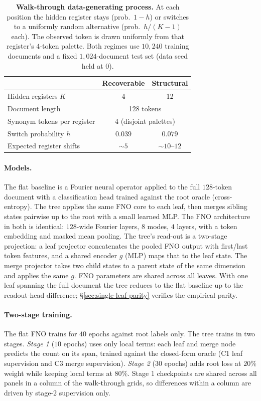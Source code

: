 \begin{table}[htbp]
    \centering
    \small
    \begin{tabular}{lcc}
        \toprule
        & \textbf{Recoverable} & \textbf{Structural} \\
        \midrule
        Hidden registers $K$ & 4 & 12 \\
        Document length & \multicolumn{2}{c}{128 tokens} \\
        Synonym tokens per register & \multicolumn{2}{c}{4 (disjoint palettes)} \\
        \midrule
        Switch probability $h$ & $0.039$ & $0.079$ \\
        Expected register shifts & ${\sim}5$ & ${\sim}10$--$12$ \\
        \bottomrule
    \end{tabular}
    \caption{\textbf{Walk-through data-generating process.}
    At each position the hidden register stays (prob.\ $1{-}h$) or switches to a uniformly random alternative (prob.\ $h/(K{-}1)$ each). The observed token is drawn uniformly from that register's $4$-token palette. Both regimes use $10{,}240$ training documents and a fixed $1{,}024$-document test set (data seed held at $0$).}
    \label{tab:dgp-full}
\end{table}

\paragraph{Models.}
The flat baseline is a Fourier neural operator applied to the full
$128$-token document with a classification head trained against the
root oracle (cross-entropy). The tree applies the same FNO core to
each leaf, then merges sibling states pairwise up to the root with a
small learned MLP. The FNO architecture in both is identical:
$128$-wide Fourier layers, $8$ modes, $4$ layers, with a token
embedding and masked mean pooling. The tree's read-out is a two-stage
projection: a leaf projector concatenates the pooled FNO output with
first/last token features, and a shared encoder $g$ (MLP) maps that
to the leaf state. The merge projector takes two child states to a
parent state of the same dimension and applies the same $g$. FNO
parameters are shared across all leaves. With one leaf spanning the
full document the tree reduces to the flat baseline up to the
readout-head difference; \S\ref{sec:single-leaf-parity} verifies the
empirical parity.

\paragraph{Two-stage training.}
The flat FNO trains for $40$ epochs against root labels only. The
tree trains in two stages. \emph{Stage 1} ($10$ epochs) uses only
local terms: each leaf and merge node predicts the count on its span,
trained against the closed-form oracle (C1 leaf supervision and C3
merge supervision). \emph{Stage 2} ($30$ epochs) adds root loss at
$20\%$ weight while keeping local terms at $80\%$. Stage 1
checkpoints are shared across all panels in a column of the
walk-through grids, so differences within a column are driven by
stage-2 supervision only.

